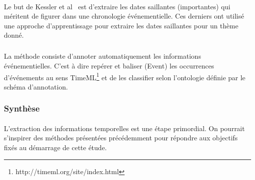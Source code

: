 \documentclass[12pt,a4	]{report}
\begin{document}
\paragraph{}
Le but de Kessler et al~\cite{kessler2013} est d'extraire les dates saillantes (importantes) qui méritent de figurer dans une chronologie événementielle.
Ces derniers ont utilisé une approche d’apprentissage pour extraire les dates saillantes pour un thème donné.
\subparagraph{}
La méthode consiste d'annoter automatiquement les informations événementielles. C’est à dire repérer et baliser (Event) les occurrences d’événements au sens TimeML\footnote{http://timeml.org/site/index.html} et de les classifier selon l’ontologie définie par le schéma d’annotation.
\subsubsection*{Synthèse}
\paragraph{}
L'extraction des informations temporelles est une étape primordial. On pourrait s'inspirer des méthodes présentées précédemment pour répondre aux objectifs fixés au démarrage de cette étude.


\printglossary[title=Glossaire]
\end{document}
